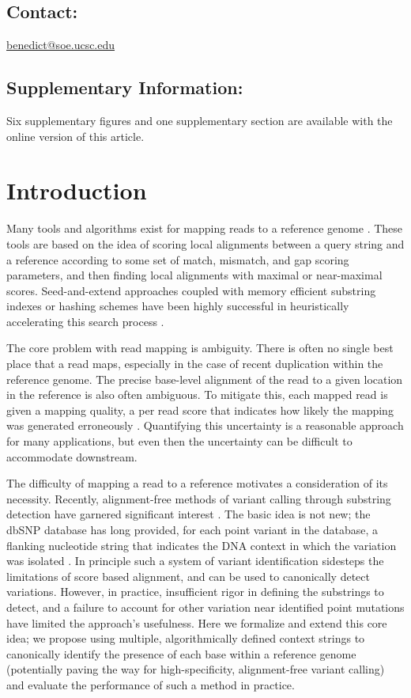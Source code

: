 \subsection{Contact:} \href{benedict@soe.ucsc.edu}{benedict@soe.ucsc.edu}
\subsection{Supplementary Information:} Six supplementary figures and one supplementary section are available with the online version of this article.

\section{Introduction}


Many tools and algorithms exist for mapping reads to a reference genome \citep{li2010fast,langmead2009ultrafast,harris2007improved}. These tools are based on the idea of scoring local alignments between a query string and a reference according to some set of match, mismatch, and gap scoring parameters, and then finding local alignments with maximal or near-maximal scores. Seed-and-extend approaches coupled with memory efficient substring indexes or hashing schemes have been highly successful in heuristically accelerating this search process \citep{dobin2013star,li2010fast,langmead2009ultrafast}. 

The core problem with read mapping is ambiguity. There is often no single best place that a read maps, especially in the case of recent duplication within the reference genome. The precise base-level alignment of the read to a given location in the reference is also often ambiguous. To mitigate this, each mapped read is given a mapping quality, a per read score that indicates how likely the mapping was generated erroneously \citep{li2008mapping}. Quantifying this uncertainty is a reasonable approach for many applications, but even then the uncertainty can be difficult to accommodate downstream.

The difficulty of mapping a read to a reference motivates a consideration of its necessity. Recently, alignment-free methods of variant calling through substring detection have garnered significant interest \citep{dilthey2015improved}. The basic idea is not new; the dbSNP database has long provided, for each point variant in the database, a flanking nucleotide string that indicates the DNA context in which the variation was isolated \citep{sherry2001dbsnp}. In principle such a system of variant identification sidesteps the limitations of score based alignment, and can be used to canonically detect variations. However, in practice, insufficient rigor in defining the substrings to detect, and a failure to account for other variation near identified point mutations have limited the approach's usefulness. Here we formalize and extend this core idea; we propose using multiple, algorithmically defined context strings to canonically identify the presence of each base within a reference genome (potentially paving the way for high-specificity, alignment-free variant calling) and evaluate the performance of such a method in practice. 

